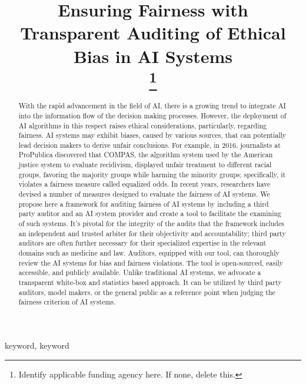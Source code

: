 \documentclass[conference]{IEEEtran}
\begin{document}
\title{Ensuring Fairness with Transparent Auditing of Ethical Bias in AI Systems\\
\thanks{Identify applicable funding agency here. If none, delete this.}
}

\author{
\and
{}
}

\maketitle

\begin{abstract}
With the rapid advancement in the field of AI, there is a growing trend
to integrate AI into the information flow of the decision making
processes. However, the deployment of AI algorithms in this respect
raises ethical considerations, particularly, regarding fairness. AI
systems may exhibit biases, caused by various sources, that can
potentially lead decision makers to derive unfair conclusions. For
example, in 2016, journalists at ProPublica discovered that COMPAS, the
algorithm system used by the American justice system to evaluate
recidivism, displayed unfair treatment to different racial groups,
favoring the majority groups while harming the minority groups;
specifically, it violates a fairness measure called equalized odds. In
recent years, researchers have devised a number of measures designed to
evaluate the fairness of AI systems. We propose here a framework for
auditing fairness of AI systems by including a third party auditor and
an AI system provider and create a tool to facilitate the examining of
such systems. It's pivotal for the integrity of the audits that the
framework includes an independent and trusted arbiter for their
objectivity and accountability; third party auditors are often further
necessary for their specialized expertise in the relevant domains such
as medicine and law. Auditors, equipped with our tool, can thoroughly
review the AI systems for bias and fairness violations. The tool is
open-sourced, easily accessible, and publicly available. Unlike
traditional AI systems, we advocate a transparent white-box and
statistics based approach. It can be utilized by third party auditors,
model makers, or the general public as a reference point when judging
the fairness criterion of AI systems.
\end{abstract}

\begin{IEEEkeywords}
keyword, keyword
\end{IEEEkeywords}
\end{document}
